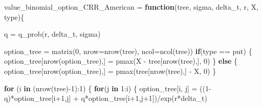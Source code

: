 \documentclass[
]{article}
\newenvironment{Shaded}{\begin{snugshade}}{\end{snugshade}}
\newcommand{\AttributeTok}[1]{\textcolor[rgb]{0.77,0.63,0.00}{#1}}
\newcommand{\ControlFlowTok}[1]{\textcolor[rgb]{0.13,0.29,0.53}{\textbf{#1}}}
\newcommand{\DecValTok}[1]{\textcolor[rgb]{0.00,0.00,0.81}{#1}}
\newcommand{\FunctionTok}[1]{\textcolor[rgb]{0.00,0.00,0.00}{#1}}
\newcommand{\NormalTok}[1]{#1}
\newcommand{\OtherTok}[1]{\textcolor[rgb]{0.56,0.35,0.01}{#1}}
\newcommand{\SpecialCharTok}[1]{\textcolor[rgb]{0.00,0.00,0.00}{#1}}
\newcommand{\StringTok}[1]{\textcolor[rgb]{0.31,0.60,0.02}{#1}}
\begin{document}
\begin{Shaded}
\begin{Highlighting}[]
\NormalTok{value\_binomial\_option\_CRR\_American }\OtherTok{=} \ControlFlowTok{function}\NormalTok{(tree, sigma, delta\_t, r, X, type)\{}
  
\NormalTok{  q }\OtherTok{=} \FunctionTok{q\_prob}\NormalTok{(r, delta\_t, sigma)}
  
\NormalTok{  option\_tree }\OtherTok{=} \FunctionTok{matrix}\NormalTok{(}\DecValTok{0}\NormalTok{, }\AttributeTok{nrow=}\FunctionTok{nrow}\NormalTok{(tree), }\AttributeTok{ncol=}\FunctionTok{ncol}\NormalTok{(tree))}
  \ControlFlowTok{if}\NormalTok{(type }\SpecialCharTok{==} \StringTok{\textquotesingle{}put\textquotesingle{}}\NormalTok{) \{}
\NormalTok{    option\_tree[}\FunctionTok{nrow}\NormalTok{(option\_tree),] }\OtherTok{=} \FunctionTok{pmax}\NormalTok{(X }\SpecialCharTok{{-}}\NormalTok{ tree[}\FunctionTok{nrow}\NormalTok{(tree),], }\DecValTok{0}\NormalTok{)}
\NormalTok{  \} }\ControlFlowTok{else}\NormalTok{ \{}
\NormalTok{    option\_tree[}\FunctionTok{nrow}\NormalTok{(option\_tree),] }\OtherTok{=} \FunctionTok{pmax}\NormalTok{(tree[}\FunctionTok{nrow}\NormalTok{(tree),] }\SpecialCharTok{{-}}\NormalTok{ X, }\DecValTok{0}\NormalTok{)}
\NormalTok{  \}}
  
  \ControlFlowTok{for}\NormalTok{ (i }\ControlFlowTok{in}\NormalTok{ (}\FunctionTok{nrow}\NormalTok{(tree)}\SpecialCharTok{{-}}\DecValTok{1}\NormalTok{)}\SpecialCharTok{:}\DecValTok{1}\NormalTok{) \{}
    \ControlFlowTok{for}\NormalTok{(j }\ControlFlowTok{in} \DecValTok{1}\SpecialCharTok{:}\NormalTok{i) \{}
\NormalTok{      option\_tree[i, j] }\OtherTok{=}\NormalTok{ ((}\DecValTok{1}\SpecialCharTok{{-}}\NormalTok{q)}\SpecialCharTok{*}\NormalTok{option\_tree[i}\SpecialCharTok{+}\DecValTok{1}\NormalTok{,j] }\SpecialCharTok{+}\NormalTok{ q}\SpecialCharTok{*}\NormalTok{option\_tree[i}\SpecialCharTok{+}\DecValTok{1}\NormalTok{,j}\SpecialCharTok{+}\DecValTok{1}\NormalTok{])}\SpecialCharTok{/}\FunctionTok{exp}\NormalTok{(r}\SpecialCharTok{*}\NormalTok{delta\_t)}
      

\end{Highlighting}
\end{Shaded}
\end{document}
